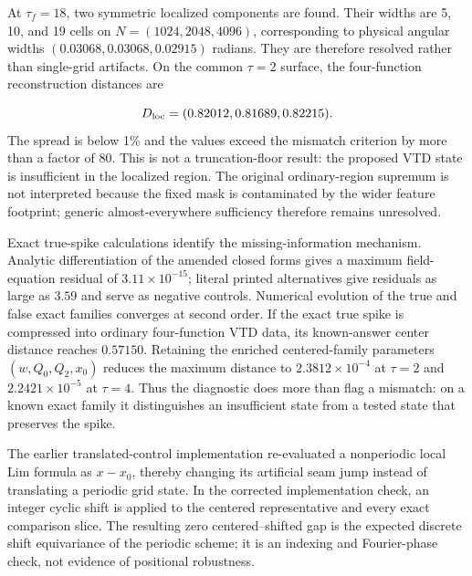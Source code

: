 \documentclass{iopjournal}
\begin{document}
At $\tau_f=18$, two symmetric localized components are found. Their widths are 5, 10, and 19 cells on $N=(1024,2048,4096)$, corresponding to physical angular widths $(0.03068,0.03068,0.02915)$ radians. They are therefore resolved rather than single-grid artifacts. On the common $\tau=2$ surface, the four-function reconstruction distances are

\[
D_{\rm loc}=(0.82012,0.81689,0.82215).
\]
The spread is below 1\% and the values exceed the mismatch criterion by more than a factor of 80. This is not a truncation-floor result: the proposed VTD state is insufficient in the localized region. The original ordinary-region supremum is not interpreted because the fixed mask is contaminated by the wider feature footprint; generic almost-everywhere sufficiency therefore remains unresolved.

Exact true-spike calculations identify the missing-information mechanism. Analytic differentiation of the amended closed forms gives a maximum field- equation residual of $3.11\times10^{-15}$; literal printed alternatives give residuals as large as $3.59$ and serve as negative controls. Numerical evolution of the true and false exact families converges at second order. If the exact true spike is compressed into ordinary four-function VTD data, its known-answer center distance reaches $0.57150$. Retaining the enriched centered-family parameters $(w,Q_0,Q_2,x_0)$ reduces the maximum distance to $2.3812\times10^{-4}$ at $\tau=2$ and $2.2421\times10^{-5}$ at $\tau=4$. Thus the diagnostic does more than flag a mismatch: on a known exact family it distinguishes an insufficient state from a tested state that preserves the spike.

The earlier translated-control implementation re-evaluated a nonperiodic local Lim formula as $x-x_0$, thereby changing its artificial seam jump instead of translating a periodic grid state. In the corrected implementation check, an integer cyclic shift is applied to the centered representative and every exact comparison slice. The resulting zero centered--shifted gap is the expected discrete shift equivariance of the periodic scheme; it is an indexing and Fourier-phase check, not evidence of positional robustness.
\end{document}
